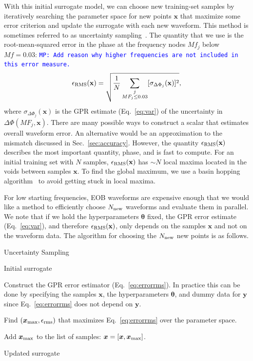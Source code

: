 \documentclass[prd,aps,letter,twocolumn,floatfix,notitlepage,nofootinbib]{revtex4-1}
\def\bx{\mathbf{x}}
\def\by{\mathbf{y}}
\def\btheta{\boldsymbol{\theta}}
\newcommand{\MP}[1]{{\textcolor{blue}{\texttt{MP: #1}} }}
\begin{document}
With this initial surrogate model, we can choose new training-set samples by iteratively searching the parameter space for new points ${\bm x}$ that maximize some error criterion and update the surrogate with each new waveform. This method is sometimes referred to as uncertainty sampling~\cite{BrochuCoraDeFreitas2010}. The quantity that we use is the root-mean-squared error in the phase at the frequency nodes $Mf_j$ below $Mf=0.03$: \MP{Add reason why higher frequencies are not included in this error measure.}
\begin{equation}
\epsilon_{\rm RMS}(\bx) = \sqrt{\frac{1}{N} \sum_{ \substack{j \\ MF_j \le 0.03} } [\sigma_{\Delta\Phi_j}(\bx)]^2},
\label{eq:errorrms}
\end{equation}
where $\sigma_{\Delta\Phi_j}(\bx)$ is the GPR estimate (Eq.~\eqref{eq:var}) of the uncertainty in $\Delta\Phi(MF_j, \bx)$. There are many possible ways to construct a scalar that estimates overall waveform error. An alternative would be an approximation to the mismatch discussed in Sec.~\ref{sec:accuracy}. However, the quantity $\epsilon_{\rm RMS}(\bx)$ describes the most important quantity, phase, and is fast to compute. For an initial training set with $N$ samples, $\epsilon_{\rm RMS}(\bx)$ has $\sim N$ local maxima located in the voids between samples $\bx$. To find the global maximum, we use a basin hopping algorithm~\cite{WalesDoye1998, scipy:basinhopping} to avoid getting stuck in local maxima.

For low starting frequencies, EOB waveforms are expensive enough that we would like a method to efficiently choose $N_{\rm new}$ waveforms and evaluate them in parallel. We note that if we hold the hyperparameters $\btheta$ fixed, the GPR error estimate (Eq.~\eqref{eq:var}), and therefore $\epsilon_{\rm RMS}(\bx)$, only depends on the samples $\bx$ and not on the waveform data. The algorithm for choosing the $N_{\rm new}$ new points is as follows.


\begin{algorithm}[H]
\caption{Uncertainty Sampling}
\label{alg:uc}
\begin{algorithmic}[1]
 Initial surrogate 

\State Construct the GPR error estimator (Eq.~\eqref{eq:errorrms}). In practice this can be done by specifying the samples $\bx$, the hyperparameters $\btheta$, and dummy data for $\by$ since Eq.~\eqref{eq:errorrms} does not depend on $\by$.

\State Find $({\bm x}_{\rm max}, \epsilon_{\rm rms})$ that maximizes Eq.~\eqref{eq:errorrms} over the parameter space.

\State Add ${\bm x}_{\rm max}$ to the list of samples: ${\bm x} = [{\bm x}, {\bm x}_{\rm max}]$.

\EndFor
{} Updated surrogate
\end{algorithmic}
\end{algorithm}
\end{document}

